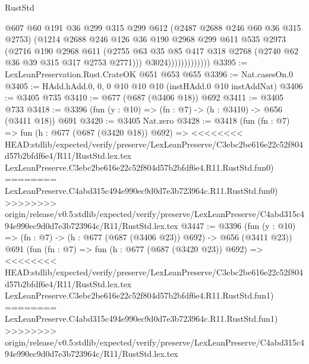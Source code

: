 \begin{lexlean}{RustStd}
\begin{coremodule}
{\begin{coremodule}
{{{{{{{{{{                            @607
                            @60
                            @191
                            @36
                            @299
                            @315
                            @299
                            @612
                            (@2487 @2688 @246 @60 @36 @315 @2753)
                            (@1214
                              @2688
                              @246
                              @126
                              @36
                              @190
                              @2968
                              @299
                              @611
                              @535
                              @2973
                              (@2716
                                @190
                                @2968
                                @611
                                (@2755
                                  @63
                                  @35
                                  @85
                                  @417
                                  @318
                                  @2768
                                  (@2740 @62 @36 @39 @315 @317 @2753 @2771)))
                              @3024)))))))))))))
@3395 := LexLeanPreservation.Rust.CrateOK @651 @653 @655
@3396 := Nat.casesOn.{0}
@3405 := HAdd.hAdd.{0, 0, 0} @10 @10 @10 (instHAdd.{0} @10 instAddNat)
@3406 := @3405 @735
@3410 := @677 (@687 (@3406 @18)) @692
@3411 := @3405 @733
@3418 := @3396 (fun (y : @10) => (fn : @7) -> (h : @3410) -> @656 (@3411 @18)) @691
@3420 := @3405 Nat.zero
@3428 := @3418
    (fun (fn : @7) =>
    fun (h : @677 (@687 (@3420 @18)) @692) =>
<<<<<<<< HEAD:stdlib/expected/verify/preserve/LexLeanPreserve/C3ebc2be616e22c52f804d57b2bfdf6e4/R11/RustStd.lex.tex
    LexLeanPreserve.C3ebc2be616e22c52f804d57b2bfdf6e4.R11.RustStd.fun0)
========
    LexLeanPreserve.C4abd315c494e990ec9d0d7e3b723964c.R11.RustStd.fun0)
>>>>>>>> origin/release/v0.5:stdlib/expected/verify/preserve/LexLeanPreserve/C4abd315c494e990ec9d0d7e3b723964c/R11/RustStd.lex.tex
@3447 := @3396
    (fun (y : @10) => (fn : @7) -> (h : @677 (@687 (@3406 @23)) @692) -> @656 (@3411 @23))
    @691
    (fun (fn : @7) =>
    fun (h : @677 (@687 (@3420 @23)) @692) =>
<<<<<<<< HEAD:stdlib/expected/verify/preserve/LexLeanPreserve/C3ebc2be616e22c52f804d57b2bfdf6e4/R11/RustStd.lex.tex
    LexLeanPreserve.C3ebc2be616e22c52f804d57b2bfdf6e4.R11.RustStd.fun1)
========
    LexLeanPreserve.C4abd315c494e990ec9d0d7e3b723964c.R11.RustStd.fun1)
>>>>>>>> origin/release/v0.5:stdlib/expected/verify/preserve/LexLeanPreserve/C4abd315c494e990ec9d0d7e3b723964c/R11/RustStd.lex.tex
}}}}}}}}}}
\end{coremodule}}
\end{coremodule}
\end{lexlean}
